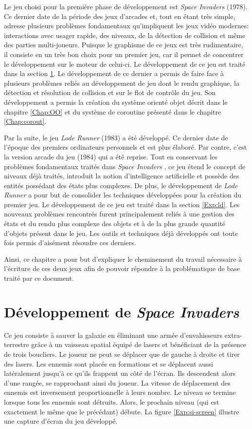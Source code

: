 \documentclass[12pt,oneside,letterpaper,francais]{book}
\newcommand{\lr}{{\textit{Lode Runner }}}
\newcommand{\si}{{\textit{Space Invaders }}}
\begin{document}
Le jeu choisi pour la première phase de développement est \si
(1978). Ce dernier date de la période des jeux d'arcades et, tout en
étant très simple, adresse plusieurs problèmes fondamentaux
qu'impliquent les jeux vidéo modernes: interactions avec usager
rapide, des niveaux, de la détection de collision et même des parties
multi-joueurs. Puisque le graphisme de ce jeux est très rudimentaire,
il consiste en un très bon choix pour un premier jeu, car il permet de
concentrer le développement sur le moteur de celui-ci. Le
développement de ce jeu est traité dans la section \ref{Exp:SI}. Le
développement de ce dernier a permis de faire face à plusieurs
problèmes reliés au développement de jeu dont le rendu graphique, la
détection et résolution de collision et sur le flot de contrôle du
jeu. Son développement a permis la création du système orienté objet
décrit dans le chapitre \ref{Chap:OO} et du système de coroutine
présenté dans le chapitre \ref{Chap:corout}.

Par la suite, le jeu \lr (1983) a été développé. Ce dernier date de
l'époque des premiers ordinateurs personnels et est plus élaboré. Par
contre, c'est la version arcade du jeu (1984) qui a été reprise. Tout
en conservant les problèmes fondamentaux traités dans \si, ce jeu
étend le concept de niveaux déjà traités, introduit la notion
d'intelligence artificielle et possède des entités possédant des états
plus complexes. De plus, le développement de \lr a pour but de
consolider les techniques développées pour la création du premier
jeu. Le développement de ce jeu est traité dans la section
\ref{Exp:ld}. Les nouveaux problèmes rencontrés furent principalement
reliés à une gestion des états et du rendu plus complexe des objets et
à de la plus grande quantité d'objets présent dans le jeu. Les outils
et techniques déjà développés ont toute fois permis d'aisément
résoudre ces derniers.

Ainsi, ce chapitre a pour but d'expliquer le cheminement du travail
nécessaire à l'écriture de ces deux jeux afin de pouvoir répondre à la
problématique de base traité par ce document.

\section{Développement de \si}
\label{Exp:SI}

Ce jeu consiste à \og sauver la galaxie \fg en éliminant une armée
d'envahisseurs extra-terrestre grâce à un vaisseau spatial équipé de
lasers et bénéficiant de la présence de trois boucliers. Le joueur ne
peut se déplacer que de gauche à droite et tirer des lasers. Les
ennemis sont placés en formations et se déplacent aussi latéralement
jusqu'à ce qu'ils frappent un côté de l'écran. Ils descendent alors
d'une rangée, se rapprochant ainsi du joueur. La vitesse de
déplacement des ennemis est inversement proportionnelle à leurs
nombre. Le niveau se termine lorsque tous les ennemis sont
détruits. Alors, le prochain niveau (qui est exactement le même que le
précédant) débute. La figure \ref{Exp:si-screen} illustre une capture
d'écran du jeu développé.
\end{document}
